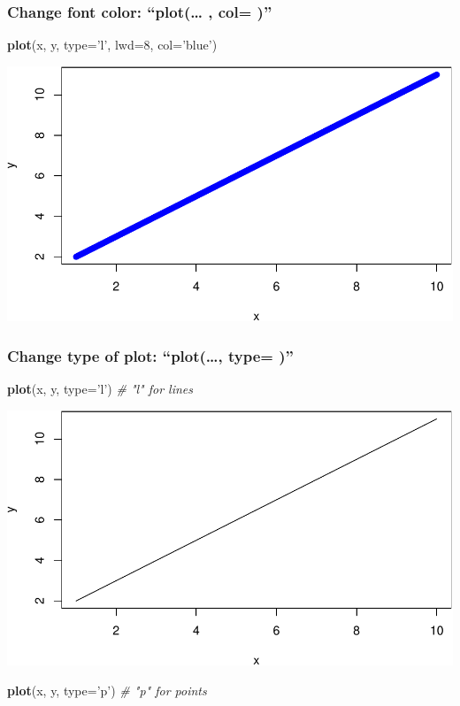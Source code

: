 \documentclass[]{article}
\newenvironment{Shaded}{\begin{snugshade}}{\end{snugshade}}
\newcommand{\CommentTok}[1]{\textcolor[rgb]{0.56,0.35,0.01}{\textit{#1}}}
\newcommand{\DataTypeTok}[1]{\textcolor[rgb]{0.13,0.29,0.53}{#1}}
\newcommand{\DecValTok}[1]{\textcolor[rgb]{0.00,0.00,0.81}{#1}}
\newcommand{\KeywordTok}[1]{\textcolor[rgb]{0.13,0.29,0.53}{\textbf{#1}}}
\newcommand{\NormalTok}[1]{#1}
\newcommand{\StringTok}[1]{\textcolor[rgb]{0.31,0.60,0.02}{#1}}
\begin{document}
\hypertarget{change-font-color-plot-col}{%
\subsubsection{Change font color: ``plot(\ldots{} , col=
)''}\label{change-font-color-plot-col}}

\begin{Shaded}
\begin{Highlighting}[]
\KeywordTok{plot}\NormalTok{(x, y, }\DataTypeTok{type=}\StringTok{'l'}\NormalTok{, }\DataTypeTok{lwd=}\DecValTok{8}\NormalTok{, }\DataTypeTok{col=}\StringTok{'blue'}\NormalTok{)}
\end{Highlighting}
\end{Shaded}

\includegraphics[width=0.5\linewidth]{tutorial_files/figure-latex/unnamed-chunk-35-1}

\hypertarget{change-type-of-plot-plot-type}{%
\subsubsection{Change type of plot: ``plot(\ldots{}, type=
)''}\label{change-type-of-plot-plot-type}}

\begin{Shaded}
\begin{Highlighting}[]
\KeywordTok{plot}\NormalTok{(x, y, }\DataTypeTok{type=}\StringTok{'l'}\NormalTok{) }\CommentTok{# "l" for lines}
\end{Highlighting}
\end{Shaded}

\includegraphics[width=0.5\linewidth]{tutorial_files/figure-latex/unnamed-chunk-36-1}

\begin{Shaded}
\begin{Highlighting}[]
\KeywordTok{plot}\NormalTok{(x, y, }\DataTypeTok{type=}\StringTok{'p'}\NormalTok{) }\CommentTok{# "p" for points}
\end{Highlighting}
\end{Shaded}
\end{document}
